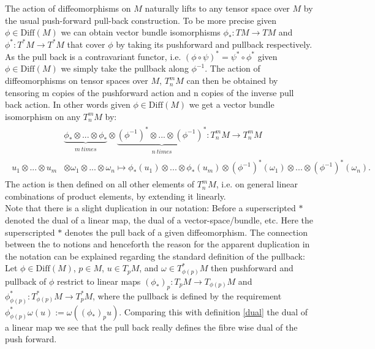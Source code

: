 \documentclass[a4paper,12pt, DIV=14, BCOR=5mm, twoside, headsepline]{scrbook}
\begin{document}
The action of diffeomorphisms on $M$ naturally lifts to any tensor space over $M$ by the usual push-forward pull-back construction. To be more precise given $\phi \in \mathrm{Diff}(M)$ we can obtain vector bundle isomorphisms $\phi_{\ast} : TM \rightarrow TM $ and $\phi^{\ast} : T^{\ast}M \rightarrow T^{\ast}M$ that cover $\phi$ by taking its pushforward and pullback respectively. As the pull back is a contravariant functor, i.e. $(\phi \circ \psi)^{\ast}=\psi^{\ast}\circ \phi^{\ast}$ given $\phi \in \mathrm{Diff}(M)$ we simply take the pullback along $\phi^{-1}$. The action of diffeomorphisms on tensor spaces over $M$, $T^m_nM$ can then be obtained by tensoring m copies of the pushforward action and n copies of the inverse pull back action. In other words given $\phi \in \mathrm{Diff}(M)$ we get a vector bundle isomorphism on any $T^m_nM$ by:
\begin{align}
\begin{aligned}
    &\underbrace{\phi_{\ast} \otimes ... \otimes \phi_{\ast}}_{\substack{m \  times}} \otimes \underbrace{(\phi^{-1})^{\ast} \otimes ... \otimes (\phi^{-1})^{\ast} }_{\substack{n \  times}} : T^m_nM \longrightarrow T^m_nM \\
    u_1 \otimes ... \otimes u_m &\otimes \omega_1 \otimes ... \otimes \omega_n \longmapsto \phi_{\ast} (u_1) \otimes ... \otimes \phi_{\ast}(u_m) \otimes (\phi^{-1})^{\ast}(\omega_1) \otimes ... \otimes (\phi^{-1})^{\ast}(\omega_n).
\end{aligned}
\end{align}
The action is then defined on all other elements of $T^m_nM$, i.e. on general linear combinations of product elements, by extending it linearly.\\

Note that there is a slight duplication in our notation: Before a superscripted $\ast$ denoted the dual of a linear map, the dual of a vector-space/bundle, etc. Here the superscripted $\ast$ denotes the pull back of a given diffeomorphism. The connection between the to notions and henceforth the reason for the apparent duplication in the notation can be explained regarding the standard definition of the pullback: Let $\phi \in \mathrm{Diff}(M)$, $p \in M$, $u \in T_pM$, and  $\omega \in T^{\ast}_{\phi(p)}M$ then pushforward and pullback of $\phi$ restrict to linear maps $(\phi_{\ast}) _p :  T_pM \rightarrow T_{\phi(p)}M$ and $\phi^{\ast}_{\phi(p)} : T^{\ast}_{\phi(p)}M \rightarrow T^{\ast}_pM$, where the pullback is defined by the requirement $\phi^{\ast}_{\phi(p)}\omega (u) := \omega ((\phi_{\ast})_p u)$. Comparing this with definition \ref{dual} the dual of a linear map we see that the pull back really defines the fibre wise dual of the push forward. 
\end{document}
